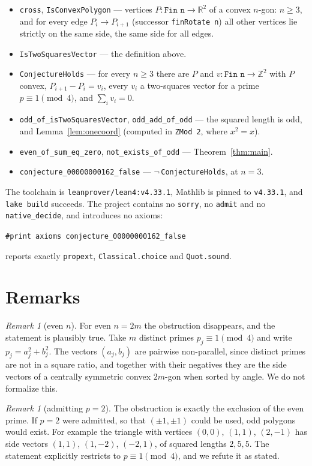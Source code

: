 \documentclass[11pt]{article}
\theoremstyle{plain}
\theoremstyle{definition}
\theoremstyle{remark}
\newtheorem{remark}[theorem]{Remark}
\begin{document}
\begin{itemize}
  \item \texttt{cross}, \texttt{IsConvexPolygon} --- vertices
    $P\colon\texttt{Fin n}\to\mathbb R^2$ of a convex $n$-gon: $n\ge3$, and for
    every edge $P_i\to P_{i+1}$ (successor \texttt{finRotate n}) all other
    vertices lie strictly on the same side, the same side for all edges.
  \item \texttt{IsTwoSquaresVector} --- the definition above.
  \item \texttt{ConjectureHolds} --- for every $n\ge3$ there are $P$ and
    $v\colon\texttt{Fin n}\to\mathbb Z^2$ with $P$ convex,
    $P_{i+1}-P_i=v_i$, every $v_i$ a two-squares vector for a prime
    $p\equiv1\pmod4$, and $\sum_iv_i=0$.
  \item \texttt{odd\_of\_isTwoSquaresVector}, \texttt{odd\_add\_of\_odd} ---
    the squared length is odd, and Lemma~\ref{lem:onecoord} (computed in
    \texttt{ZMod 2}, where $x^2=x$).
  \item \texttt{even\_of\_sum\_eq\_zero}, \texttt{not\_exists\_of\_odd} ---
    Theorem~\ref{thm:main}.
  \item \texttt{conjecture\_00000000162\_false} ---
    $\lnot\,$\texttt{ConjectureHolds}, at $n=3$.
\end{itemize}

The toolchain is \texttt{leanprover/lean4:v4.33.1}, Mathlib is pinned to
\texttt{v4.33.1}, and \texttt{lake build} succeeds. The project contains no
\texttt{sorry}, no \texttt{admit} and no \texttt{native\_decide}, and
introduces no axioms:
\begin{center}
\texttt{\#print axioms conjecture\_00000000162\_false}
\end{center}
reports exactly \texttt{propext}, \texttt{Classical.choice} and
\texttt{Quot.sound}.

\section{Remarks}

\begin{remark}[even $n$]
For even $n=2m$ the obstruction disappears, and the statement is plausibly
true. Take $m$ distinct primes $p_j\equiv1\pmod4$ and write $p_j=a_j^2+b_j^2$.
The vectors $(a_j,b_j)$ are pairwise non-parallel, since distinct primes are
not in a square ratio, and together with their negatives they are the side
vectors of a centrally symmetric convex $2m$-gon when sorted by angle. We do
not formalize this.
\end{remark}

\begin{remark}[admitting $p=2$]\label{rem:two}
The obstruction is exactly the exclusion of the even prime. If $p=2$ were
admitted, so that $(\pm1,\pm1)$ could be used, odd polygons would exist. For
example the triangle with vertices $(0,0)$, $(1,1)$, $(2,-1)$ has side vectors
$(1,1)$, $(1,-2)$, $(-2,1)$, of squared lengths $2,5,5$. The statement
explicitly restricts to $p\equiv1\pmod4$, and we refute it as stated.
\end{remark}
\end{document}
